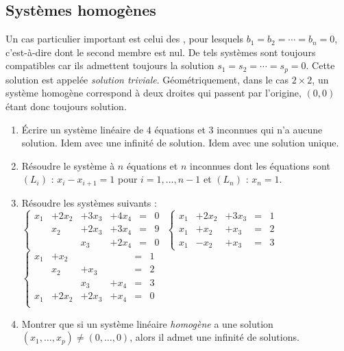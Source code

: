 \documentclass[class=report,crop=false]{standalone}
\begin{document}
\subsection{Systèmes homogènes}

Un cas particulier important est celui des , pour lesquels
$b_1=b_2=\cdots=b_n=0$, c'est-à-dire dont le second membre est nul.
De tels systèmes sont toujours compatibles car ils admettent toujours
la solution $s_1=s_2=\cdots=s_p=0$. Cette solution est appelée
\emph{solution triviale}. Géométriquement, dans le cas $2\times2$,
un système homogène correspond à deux droites qui passent par l'origine,
$(0,0)$ étant donc toujours solution.




\begin{miniexercices}
\sauteligne
\begin{enumerate}
  \item \'Ecrire  un système linéaire de $4$ équations et $3$
  inconnues qui n'a aucune solution. Idem avec une infinité de solution.
  Idem avec une solution unique.

  \item Résoudre le système à $n$ équations et $n$ inconnues dont les équations sont
  $(L_i)$ : $x_i - x_{i+1} = 1$ pour $i=1,\ldots, n-1$ et $(L_n)$ : $x_n=1$.

  \item Résoudre les systèmes suivants : \\
$\left\{  \begin{array}{cccccc}
 x_1 & +2x_2 & +3x_3 & +4x_4 &=& 0\\
     & x_2   & +2x_3 & +3x_4 &=& 9\\
     &       & x_3   & +2x_4 &=& 0
 \end{array} \right.
$
$\left\{  \begin{array}{ccccc}
 x_1 & +2x_2 & +3x_3 &=& 1\\
 x_1 & +x_2  & +x_3  &=& 2\\
 x_1 & -x_2  & +x_3  &=& 3
 \end{array} \right.
$
$\left\{  \begin{array}{cccccc}
 x_1 & + x_2 &       &       &=& 1\\
     & x_2   & + x_3 &       &=& 2\\
     &       & x_3   & + x_4 &=& 3\\
 x_1 & +2x_2 & +2x_3 & + x_4 &=& 0\\
 \end{array} \right.
$

  \item Montrer que si un système linéaire \emph{homogène} a une solution
  $(x_1,\ldots,x_p) \neq (0,\ldots,0)$, alors il admet une infinité de solutions.

\end{enumerate}
\end{miniexercices}
\end{document}
